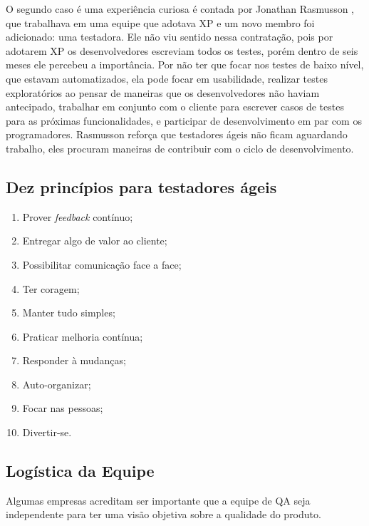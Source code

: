 \documentclass[
	12pt,				%
	openright,			%
	oneside,			%
	a4paper,			%
	english,			%
	brazil,				%
	]{abntex2}
\begin{document}
O segundo caso é uma experiência curiosa é contada por Jonathan Rasmusson \cite{crispin2009}, que trabalhava em uma equipe que adotava XP e um novo membro foi adicionado: uma testadora. Ele não viu sentido nessa contratação, pois por adotarem XP os desenvolvedores escreviam todos os testes, porém dentro de seis meses ele percebeu a importância. Por não ter que focar nos testes de baixo nível, que estavam automatizados, ela pode focar em usabilidade, realizar testes exploratórios ao pensar de maneiras que os desenvolvedores não haviam antecipado, trabalhar em conjunto com o cliente para escrever casos de testes para as próximas funcionalidades, e participar de desenvolvimento em par com os programadores. Rasmusson reforça que testadores ágeis não ficam aguardando trabalho, eles procuram maneiras de contribuir com o ciclo de desenvolvimento.

\subsection{Dez princípios para testadores ágeis}


\begin{enumerate}
    \item Prover \emph{feedback} contínuo;
    \item Entregar algo de valor ao cliente;
    \item Possibilitar comunicação face a face;
    \item Ter coragem;
    \item Manter tudo simples;
    \item Praticar melhoria contínua;
    \item Responder à mudanças;
    \item Auto-organizar;
    \item Focar nas pessoas;
    \item Divertir-se.
\end{enumerate}

\subsection{Logística da Equipe}
Algumas empresas acreditam ser importante que a equipe de QA seja independente para ter uma visão objetiva sobre a qualidade do produto. 
\end{document}
